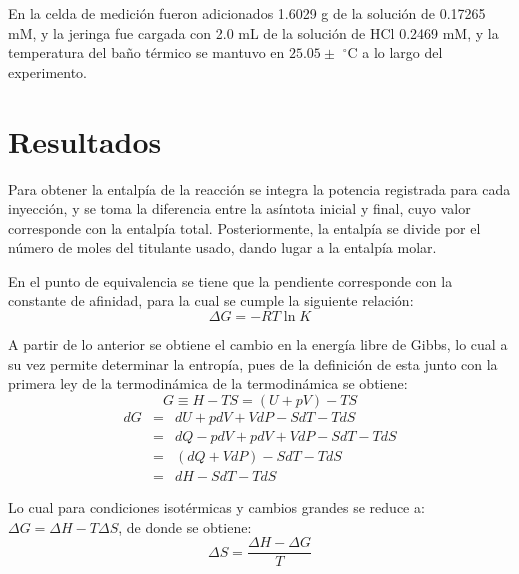 	En la celda de medición fueron adicionados 1.6029 g de la solución de  0.17265 mM, y la jeringa fue cargada con 2.0 mL de la soluci\'on de HCl 0.2469 mM, y la temperatura del ba\~no t\'ermico se mantuvo en $25.05 \pm $ $^\circ$C a lo largo del experimento. 
	
\section{Resultados}
	Para obtener la entalp\'ia de la reacci\'on se integra la potencia registrada para cada inyecci\'on, y se toma la diferencia entre la as\'intota inicial y final, cuyo valor corresponde con la entalp\'ia total. Posteriormente, la entalp\'ia se divide por el n\'umero de moles del titulante usado, dando lugar a la entalp\'ia molar. 
	
	En el punto de equivalencia se tiene que la pendiente corresponde con la constante de afinidad, para la cual se cumple la siguiente relaci\'on: 
	\begin{equation}
		\Delta G = -RT\ln K
	\end{equation}
	
	A partir de lo anterior se obtiene el cambio en la energ\'ia libre de Gibbs, lo cual a su vez permite determinar la entrop\'ia, pues de la definici\'on de esta junto con la primera ley de la termodin\'amica de la termodin\'amica se obtiene:
	\begin{equation}
		G \equiv H - TS = (U + pV) - TS
	\end{equation}
	\begin{equation}
		\begin{matrix}
			dG & = & dU + pdV + VdP - SdT -TdS \\
			& = & dQ - pdV + pdV + VdP -SdT -TdS \\
			& = & (dQ + VdP) - SdT - TdS \\
			& = & dH - SdT - TdS
		\end{matrix}
	\end{equation}
	
	Lo cual para condiciones isot\'ermicas y cambios grandes se reduce a: $\Delta G = \Delta H - T\Delta S$, de donde se obtiene:
	\begin{equation}
		\Delta S = \dfrac{\Delta H - \Delta G}{T}
	\end{equation}